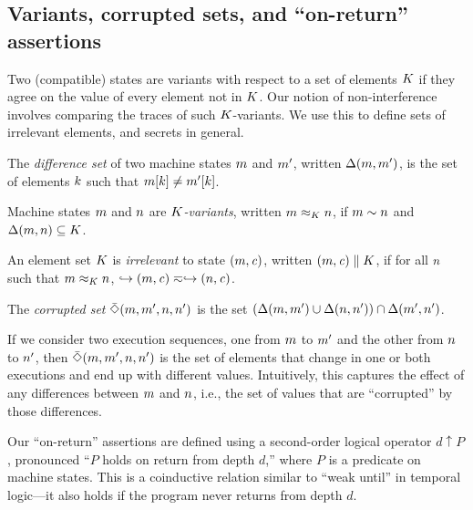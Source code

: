 \documentclass[10pt,conference]{ieeetran}%
\theoremstyle{definition}
\begin{document}
\subsection{Variants, corrupted sets, and ``on-return'' assertions}
\label{sec:props}

Two (compatible) states are variants with respect to a set of elements \(K\)
if they agree on the value of every element not in \(K\). 
Our notion of non-interference involves comparing the traces of such
\(K\)-variants. We use this to define sets of irrelevant elements,
and secrets in general.

 The \emph{difference set} of two machine states \(m\) and \(m'\), written \(\Delta(m,m')\),
is the set of elements \(k\) such that \(m[k] \not = m'[k]\).

 Machine states \(m\) and \(n\) are {\em \(K\)-variants},
written \(m \approx_K n\), if \(m\sim n\) and
\(\Delta(m,n) \subseteq K\). 

 An element set \(K\) is \emph{irrelevant} to state \((m,\mathit{c})\),
written \((m,\mathit{c}) \parallel K\), if for all
\(n\) such that \(m \approx_{K} n\),
\(\hookrightarrow (m,\mathit{c})  \eqsim \hookrightarrow (n,\mathit{c})\).

 The {\em corrupted set} \(\bar{\Diamond}(m,m',n,n')\)
is the set \((\Delta(m,m') \cup \Delta(n,n')) \cap \Delta(m',n')\).

If we consider two execution sequences, one from \(m\) to \(m'\)
and the other from \(n\) to \(n'\),
then \(\bar{\Diamond}(m,m',n,n')\) is the set of elements that
change in one or both executions and end up with different values. Intuitively,
this captures the effect of any differences between \(m\) and \(n\), i.e.,
the set of values that are ``corrupted'' by those differences.

Our ``on-return'' assertions are defined using a second-order logical operator
\(d \uparrow P\), pronounced ``\(P\) holds on return from depth \(d\),''
where \(P\) is a predicate on machine states. This is a coinductive relation
similar to ``weak until'' in temporal logic---it also holds if the program never
returns from depth \(d\).
\end{document}
